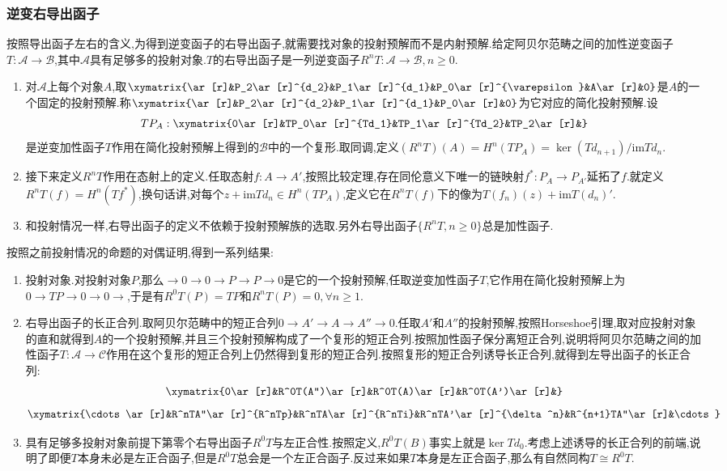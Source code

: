 \subsubsection{逆变右导出函子}

按照导出函子左右的含义,为得到逆变函子的右导出函子,就需要找对象的投射预解而不是内射预解.给定阿贝尔范畴之间的加性逆变函子$T:\mathscr{A}\to\mathscr{B}$,其中$\mathscr{A}$具有足够多的投射对象.$T$的右导出函子是一列逆变函子$R^nT:\mathscr{A}\to\mathscr{B},n\ge0$.
\begin{enumerate}
	\item 对$\mathscr{A}$上每个对象$A$,取$\xymatrix{\ar[r]&P_2\ar[r]^{d_2}&P_1\ar[r]^{d_1}&P_0\ar[r]^{\varepsilon}&A\ar[r]&0}$是$A$的一个固定的投射预解.称$\xymatrix{\ar[r]&P_2\ar[r]^{d_2}&P_1\ar[r]^{d_1}&P_0\ar[r]&0}$为它对应的简化投射预解.设$$TP_A:\xymatrix{0\ar[r]&TP_0\ar[r]^{Td_1}&TP_1\ar[r]^{Td_2}&TP_2\ar[r]&}$$是逆变加性函子$T$作用在简化投射预解上得到的$\mathscr{B}$中的一个复形.取同调,定义$(R^nT)(A)=H^n(TP_A)=\ker(Td_{n+1})/\mathrm{im}Td_n$.
	\item 接下来定义$R^nT$作用在态射上的定义.任取态射$f:A\to A'$,按照比较定理,存在同伦意义下唯一的链映射$f^*:P_A\to P_{A'}$延拓了$f$.就定义$R^nT(f)=H^n(Tf^*)$,换句话讲,对每个$z+\mathrm{im}Td_{n}\in H^n(TP_A)$,定义它在$R^nT(f)$下的像为$T(f_n)(z)+\mathrm{im}T(d_n)'$.
	\item 和投射情况一样,右导出函子的定义不依赖于投射预解族的选取.另外右导出函子$\{R^nT,n\ge0\}$总是加性函子.
\end{enumerate}

按照之前投射情况的命题的对偶证明,得到一系列结果:
\begin{enumerate}
	\item 投射对象.对投射对象$P$,那么$\to0\to0\to P\to P\to0$是它的一个投射预解,任取逆变加性函子$T$,它作用在简化投射预解上为$0\to TP\to0\to0\to$,于是有$R^0T(P)=TP$和$R^nT(P)=0,\forall n\ge1$.
	\item 右导出函子的长正合列.取阿贝尔范畴中的短正合列$0\to A'\to A\to A''\to0$.任取$A'$和$A''$的投射预解,按照Horseshoe引理,取对应投射对象的直和就得到$A$的一个投射预解,并且三个投射预解构成了一个复形的短正合列.按照加性函子保分离短正合列,说明将阿贝尔范畴之间的加性函子$T:\mathscr{A}\to\mathscr{C}$作用在这个复形的短正合列上仍然得到复形的短正合列.按照复形的短正合列诱导长正合列,就得到左导出函子的长正合列:
	$$\xymatrix{0\ar[r]&R^0T(A'')\ar[r]&R^0T(A)\ar[r]&R^0T(A')\ar[r]&}$$
	$$\xymatrix{\cdots\ar[r]&R^nTA''\ar[r]^{R^nTp}&R^nTA\ar[r]^{R^nTi}&R^nTA'\ar[r]^{\delta^n}&R^{n+1}TA''\ar[r]&\cdots}$$
	\item 具有足够多投射对象前提下第零个右导出函子$R^0T$与左正合性.按照定义,$R^0T(B)$事实上就是$\ker Td_0$.考虑上述诱导的长正合列的前端,说明了即便$T$本身未必是左正合函子,但是$R^0T$总会是一个左正合函子.反过来如果$T$本身是左正合函子,那么有自然同构$T\cong R^0T$.
\end{enumerate}

